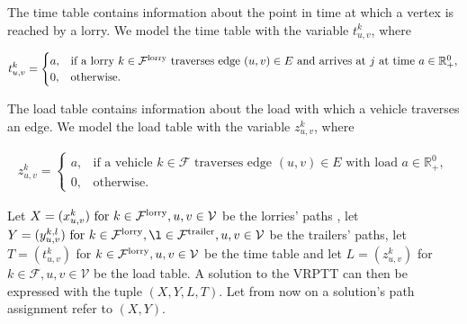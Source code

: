 
The time table contains information about the point in time at which a vertex is reached by a lorry.
We model the time table with the variable $t^k_{u,v}$, where


\begin{align}
  t^k_{u,v} =
  \begin{cases}
    a ,       & \text{if a lorry $k \in \mathcal F^{\rm lorry}$ traverses edge $(u,v) \in E$ and arrives at $j$ at time $a \in \mathbb{R}^0_+$}, \\
    0,        & \text{otherwise. }
  \end{cases}
\end{align}


The load table contains information about the load with which a vehicle traverses an edge.
We model the load table with the variable $z^k_{u,v}$, where

\begin{align}
  z^k_{u,v} =
  \begin{cases}
    a ,       & \text{if a vehicle $k \in \mathcal F$ traverses edge $(u,v) \in  E $ with load $a \in \mathbb{R}^0_+ $}, \\
    0,        & \text{otherwise. }
  \end{cases}
\end{align}


Let $ X = (x^k_{u,v}) \text{ for } k \in  \mathcal F^{\rm lorry}, u,v \in \mathcal V$
be the lorries' paths ,
let
$ Y = (y^{k,l}_{u,v}) \text{ for } k \in  \mathcal F^{\rm lorry} ,
\l  \in  \mathcal F^{\rm trailer}, u,v \in \mathcal V$
be the trailers' paths,
let
$ T = (t^k_{u,v}) $ for $ k \in  \mathcal F^{\rm lorry}, u,v \in \mathcal V$
be the time table and let
$ L = (z^k_{u,v}) $ for $ k \in  \mathcal F, u,v \in \mathcal V$
be the load table.
A solution to the VRPTT can then be expressed with the tuple $(X,Y,L,T)$.
Let from now on a solution's path assignment refer to
$(X,Y)$.\\

%
%
%


